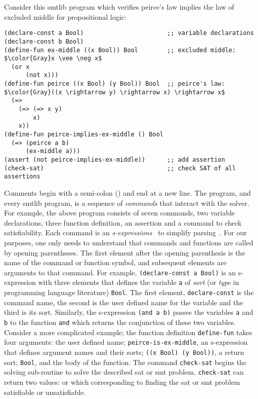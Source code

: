 Consider this \acl{smtlib} program which verifies peirce's law implies the law
of excluded middle for propositional logic:
%
\begin{lstlisting}[columns=flexible,keepspaces=true,language=SMTLIB]
(declare-const a Bool)                       ;; variable declarations
(declare-const b Bool)
(define-fun ex-middle ((x Bool)) Bool        ;; excluded middle: $\color{Gray}x \vee \neg x$
  (or x
      (not x)))
(define-fun peirce ((x Bool) (y Bool)) Bool  ;; peirce's law: $\color{Gray}((x \rightarrow y) \rightarrow x) \rightarrow x$
  (=>
    (=> (=> x y)
        x)
    x))
(define-fun peirce-implies-ex-middle () Bool
  (=> (peirce a b)
      (ex-middle a)))
(assert (not peirce-implies-ex-middle))      ;; add assertion
(check-sat)                                  ;; check SAT of all assertions
\end{lstlisting}
%
Comments begin with a semi-colon (\rn{;}) and end at a new line. The program,
and every \acl{smtlib} program, is a sequence of \emph{commands} that interact
with the solver. For example, the above program consists of seven commands, two
variable declarations, three function definition, an assertion and a command to
check satisfiability. Each command is an
\emph{s-expressions}~\cite{10.1145/367177.367199} to simplify
parsing~\cite{BarFT-SMTLIB}. For our purposes, one only needs to understand that
commands and functions are called by opening parentheses. The first element
after the opening parenthesis is the name of the command or function symbol, and
subsequent elements are arguments to that command. For example,
\lstinline{(declare-const a Bool)} is an s-expression with three elements that
defines the \pl{} variable \lstinline{a} of \emph{sort} (or \emph{type} in
programming language literature) \lstinline{Bool}. The first element,
\lstinline{declare-const} is the command name, the second is the user defined
name for the variable and the third is its sort. Similarly, the s-expression
\lstinline{(and a b)} passes the variables \lstinline{a} and \lstinline{b} to
the function \lstinline{and} which returns the conjunction of these two
variables. Consider a more complicated example; the function definition
\lstinline{define-fun} takes four arguments: the user defined name;
\lstinline{peirce-is-ex-middle}, an s-expression that defines argument names and
their sorts; \lstinline{((x Bool) (y Bool))}, a return sort; \lstinline{Bool},
and the body of the function. The command \lstinline{check-sat} begins the
solving sub-routine to solve the described \ac{sat} or \ac{smt} problem.
\lstinline{check-sat} can return two values:  or  which
corresponding to finding the \ac{sat} or \ac{smt} problem satisfiable or
unsatisfiable.

